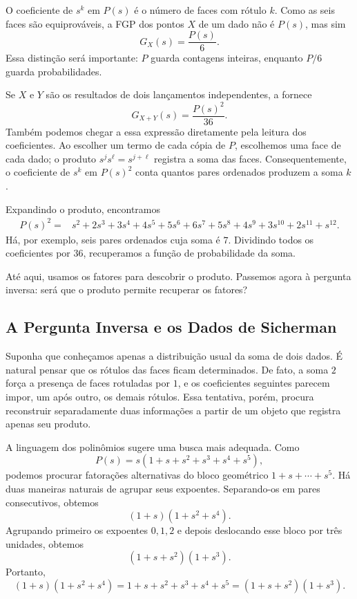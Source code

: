 \documentclass[12pt,portuguese]{article}
\theoremstyle{definition}
\theoremstyle{plainexercise}
\theoremstyle{starredexercise}
\theoremstyle{definition}
\begin{document}
O coeficiente de $s^k$ em $P(s)$ é o número de faces com rótulo $k$.
Como as seis faces são equiprováveis,
a FGP dos pontos $X$ de um dado não é $P(s)$,
mas sim
\[
G_X(s)=\frac{P(s)}{6}.
\]
Essa distinção será importante:
$P$ guarda contagens inteiras,
enquanto $P/6$ guarda probabilidades.

Se $X$ e $Y$ são os resultados de dois lançamentos independentes,
a  fornece
\[
G_{X+Y}(s)=\frac{P(s)^2}{36}.
\]
Também podemos chegar a essa expressão diretamente pela leitura dos
coeficientes.
Ao escolher um termo de cada cópia de $P$,
escolhemos uma face de cada dado;
o produto $s^js^\ell=s^{j+\ell}$ registra a soma das faces.
Consequentemente, o coeficiente de $s^k$ em $P(s)^2$ conta quantos pares
ordenados produzem a soma $k$.

Expandindo o produto, encontramos
\begin{equation}\label{eq:produto-quadrado}
\begin{aligned}
P(s)^2={}&s^2+2s^3+3s^4+4s^5+5s^6+6s^7
+5s^8+4s^9+3s^{10}+2s^{11}+s^{12}.
\end{aligned}
\end{equation}
Há, por exemplo, seis pares ordenados cuja soma é $7$.
Dividindo todos os coeficientes por $36$,
recuperamos a função de probabilidade da soma.

Até aqui, usamos os fatores para descobrir o produto.
Passemos agora à pergunta inversa:
será que o produto permite recuperar os fatores?

\subsection{A Pergunta Inversa e os Dados de Sicherman}\label{sec:sicherman}

Suponha que conheçamos apenas a distribuição usual da soma de dois dados.
É natural pensar que os rótulos das faces ficam determinados.
De fato, a soma $2$ força a presença de faces rotuladas por $1$,
e os coeficientes seguintes parecem impor, um após outro,
os demais rótulos.
Essa tentativa, porém, procura reconstruir separadamente duas informações
a partir de um objeto que registra apenas seu produto.

A linguagem dos polinômios sugere uma busca mais adequada.
Como
\[
P(s)=s(1+s+s^2+s^3+s^4+s^5),
\]
podemos procurar fatorações alternativas do bloco geométrico
$1+s+\cdots+s^5$.
Há duas maneiras naturais de agrupar seus expoentes.
Separando-os em pares consecutivos, obtemos
\[
(1+s)(1+s^2+s^4).
\]
Agrupando primeiro os expoentes $0,1,2$ e depois deslocando esse bloco
por três unidades, obtemos
\[
(1+s+s^2)(1+s^3).
\]
Portanto,
\begin{equation}\label{eq:identidade-chave}
(1+s)(1+s^2+s^4)
=1+s+s^2+s^3+s^4+s^5
=(1+s+s^2)(1+s^3).
\end{equation}
\end{document}

